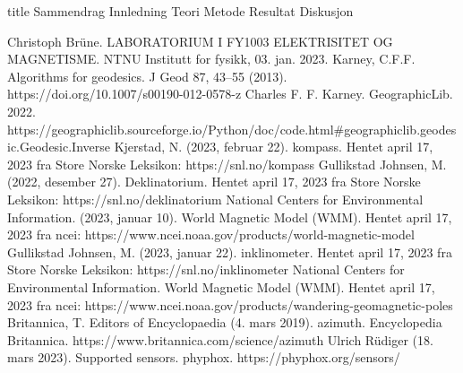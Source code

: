 \documentclass[5p]{article}
\begin{document}
{title} %
{Sammendrag}
\pagebreak
{Innledning}
{Teori}
{Metode}
{Resultat}
{Diskusjon}

\begin{thebibliography}{5}
Christoph Brüne. LABORATORIUM I FY1003 ELEKTRISITET OG MAGNETISME. NTNU Institutt for fysikk, 03. jan. 2023.
 Karney, C.F.F. Algorithms for geodesics. J Geod 87, 43–55 (2013). https://doi.org/10.1007/s00190-012-0578-z
 Charles F. F. Karney. GeographicLib. 2022. \\
https://geographiclib.sourceforge.io/Python/doc/code.html\#geographiclib.geodesic.Geodesic.Inverse
Kjerstad, N. (2023, februar 22). kompass. Hentet april 17, 2023 fra Store Norske Leksikon: https://snl.no/kompass
Gullikstad Johnsen, M. (2022, desember 27). Deklinatorium. Hentet april 17, 2023 fra Store Norske Leksikon: https://snl.no/deklinatorium
National Centers for Environmental Information. (2023, januar 10). World Magnetic Model (WMM). Hentet april 17, 
2023 fra ncei: https://www.ncei.noaa.gov/products/world-magnetic-model
Gullikstad Johnsen, M. (2023, januar 22). inklinometer. Hentet april 17, 2023 fra Store Norske Leksikon: https://snl.no/inklinometer
National Centers for Environmental Information. World Magnetic Model (WMM). Hentet april 17, 
2023 fra ncei: https://www.ncei.noaa.gov/products/wandering-geomagnetic-poles
 Britannica, T. Editors of Encyclopaedia (4. mars 2019). azimuth. Encyclopedia Britannica. https://www.britannica.com/science/azimuth
 Ulrich Rüdiger (18. mars 2023). Supported sensors. phyphox. 
https://phyphox.org/sensors/

\end{thebibliography}
\end{document}
